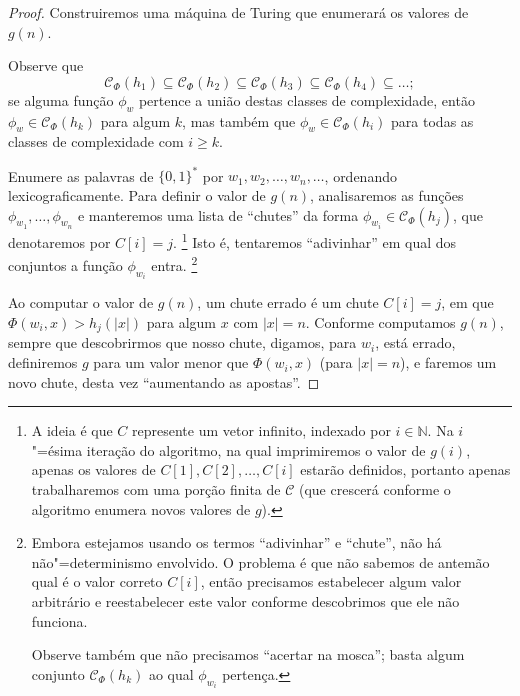 \begin{proof}
    Construiremos uma máquina de Turing
    que enumerará os valores de $g(n)$.

    Observe que
    \begin{equation*}
        \mathcal C_\Phi(h_1) \subseteq
        \mathcal C_\Phi(h_2) \subseteq
        \mathcal C_\Phi(h_3) \subseteq
        \mathcal C_\Phi(h_4) \subseteq
        \dots;
    \end{equation*}
    se alguma função $\phi_w$ pertence a união destas classes de complexidade,
    então $\phi_w \in \mathcal C_\Phi(h_k)$ para algum $k$,
    mas também que $\phi_w \in \mathcal C_\Phi(h_i)$
    para todas as classes de complexidade com $i \geq k$.

    Enumere as palavras de $\{0, 1\}^*$ por $w_1, w_2, \dots, w_n, \dots$,
    ordenando lexicograficamente.
    Para definir o valor de $g(n)$,
    analisaremos as funções $\phi_{w_1}, \dots, \phi_{w_n}$
    e manteremos uma lista de ``chutes''
    da forma $\phi_{w_i} \in \mathcal C_\Phi(h_j)$,
    que denotaremos por $C[i] = j$.%
    \footnote{
        A ideia é que $C$ represente um vetor infinito,
        indexado por $i \in \mathbb N$.
        Na $i$"=ésima iteração do algoritmo,
        na qual imprimiremos o valor de $g(i)$,
        apenas os valores de $C[1], C[2], \dots, C[i]$
        estarão definidos,
        portanto apenas trabalharemos com uma porção finita de $\mathcal C$
        (que crescerá conforme o algoritmo enumera novos valores de $g$).
    }
    Isto é, tentaremos ``adivinhar''
    em qual dos conjuntos a função $\phi_{w_i}$ entra.%
    \footnote{
        Embora estejamos usando os termos
        ``adivinhar'' e ``chute'',
        não há não"=determinismo envolvido.
        O problema é que não sabemos de antemão
        qual é o valor correto $C[i]$,
        então precisamos estabelecer algum valor arbitrário
        e reestabelecer este valor
        conforme descobrimos que ele não funciona.

        Observe também que não precisamos
        ``acertar na mosca'';
        basta algum conjunto $\mathcal C_\Phi(h_k)$
        ao qual $\phi_{w_i}$ pertença.
    }

    Ao computar o valor de $g(n)$,
    um chute errado
    é um chute $C[i] = j$,
    em que $\Phi(w_i, x) > h_j(|x|)$
    para algum $x$ com $|x| = n$.
    Conforme computamos $g(n)$,
    sempre que descobrirmos que nosso chute,
    digamos, para $w_i$, está errado,
    definiremos $g$ para um valor menor que $\Phi(w_i, x)$
    (para $|x| = n$),
    e faremos um novo chute,
    desta vez ``aumentando as apostas''.


\end{proof}

